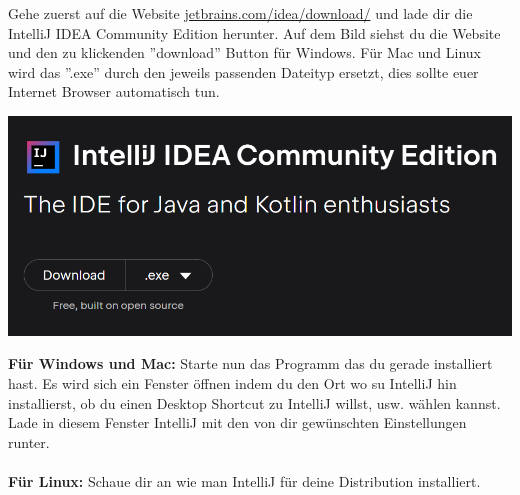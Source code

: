 
\label{ex1}
Gehe zuerst auf die Website \href{intellijurl}{jetbrains.com/idea/download/} und lade dir die IntelliJ IDEA Community Edition herunter. Auf dem Bild siehst du die Website und den zu klickenden ''download'' Button für Windows. Für Mac und Linux wird das ''.exe'' durch den jeweils passenden Dateityp ersetzt, dies sollte euer Internet Browser automatisch tun.
\begin{center}
    \includegraphics[width=\linewidth]{./3/IntelliJ download site.PNG}
\end{center}
\textbf{Für Windows und Mac:}\newline
Starte nun das Programm das du gerade installiert hast. Es wird sich ein Fenster öffnen indem du den Ort wo su IntelliJ hin installierst, ob du einen Desktop Shortcut zu IntelliJ willst, usw. wählen kannst. Lade in diesem Fenster IntelliJ mit den von dir gewünschten Einstellungen runter.\\\\

\textbf{Für Linux:}\newline
Schaue dir an wie man IntelliJ für deine Distribution installiert.


